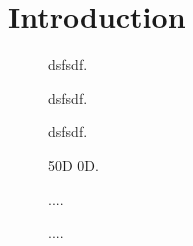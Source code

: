 \section{Introduction}
\lipsum[5]


\begin{figure}[h]
	\centering
    
	\caption{dsfsdf.}
	\label{fig:controllerboardv2_startup}
\end{figure}

\begin{figure}[h]
	\centering
    
	\caption{dsfsdf.}
	\label{fig:controllerboardv2_shutdown}
\end{figure}

\begin{figure}[h]
	\centering
    
	\caption{dsfsdf.}
	\label{fig:controllerboardv2_inrushcurrent_charge}
\end{figure}

\begin{figure}[h]
	\centering
    
	\caption{50D 0D.}
	\label{fig:controllerboardv2_}
\end{figure}

\begin{figure}[h]
	\centering
    
	\caption{....}
	\label{fig:controllerboardv2_}
\end{figure}


\begin{figure}[h]
	\centering
    
	\caption{....}
	\label{fig:controllerboardv2_}
\end{figure}